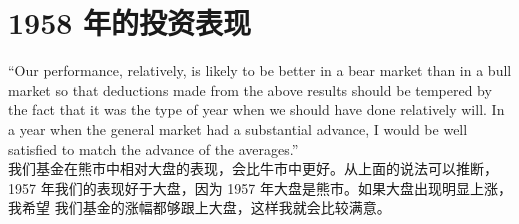 \section{1958 年的投资表现}

\begin{verseparallel}
  {
  }
  {
  }
\end{verseparallel}

\begin{quoteparallel}
    { 
      “Our performance, relatively, is likely to be better in a bear market
      than in a bull market so that deductions made from the above results
      should be tempered by the fact that it was the type of year when we should
      have done relatively will. In a year when the general market had a
      substantial advance, I would be well satisfied to match the advance of the
      averages.” \\
    }
    {
      我们基金在熊市中相对大盘的表现，会比牛市中更好。从上面的说法可以推断，1957
      年我们的表现好于大盘，因为 1957 年大盘是熊市。如果大盘出现明显上涨，我希望
      我们基金的涨幅都够跟上大盘，这样我就会比较满意。
    }
\end{quoteparallel}
  
